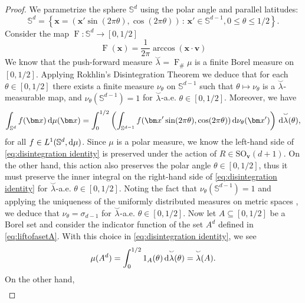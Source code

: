 \documentclass[reqno, a4paper]{amsart}
\def\F{\operatorname{F}}
\renewcommand{\d}{\text{\rm d}}
\newcommand{\Sd}{\mathbb{S}^d}
\newcommand{\x}{{\bm x}}
\renewcommand{\v}{{\bm v}}
\newcommand{\lambdarc}{\overset{\smallsmile}{\lambda}}
\theoremstyle{plain}
\theoremstyle{definition}
\theoremstyle{remarkstyle}
\numberwithin{equation}{section}
\begin{document}
\begin{proof}
   We parametrize the sphere $\Sd$ using the polar angle and parallel latitudes: 
\begin{equation*}
    \Sd=\left\{\x=(\x'\sin(2\pi \theta), \cos(2\pi \theta)) \,:\, \x'\in \mathbb{S}^{d-1}, 0\leq \theta\leq 1/2\right\}. 
\end{equation*}
Consider the map $\operatorname{F}:\Sd\to [0, 1/2]$
\begin{equation*}
    \F(\x)=\frac{1}{2\pi} \arccos(\x\cdot\v)
\end{equation*}
We know that the push-forward measure $\lambdarc=\operatorname{F}_{\#} \mu$ is a finite Borel measure on $[0, 1/2]$. Applying Rokhlin's Disintegration Theorem \cite[Theorem 5.3.1]{AmbrosioGigliSavare2008-GradientFlows}
we deduce that for each $\theta \in [0, 1/2]$ there exists a finite measure $\nu_\theta$ on $\mathbb{S}^{d-1}$ such that $\theta \mapsto \nu_\theta$ is a $\lambdarc$-measurable map, and $\nu_\theta(\mathbb{S}^{d-1})=1$ for $\lambdarc$-a.e. $\theta\in [0, 1/2]$. Moreover, we have
\begin{equation}\label{eq:disintegration identity}
    \int_{\Sd} f(\bm x)\, \d\mu(\bm x)= \int_{0}^{1/2} \left(\int_{\mathbb{S}^{d-1}} f(\x'\sin(2\pi \theta), \cos(2\pi \theta))\,\d\nu_\theta(\bm x')\right)\,\d\lambdarc(\theta),
\end{equation}
for all $f \in L^1(\Sd, \d\mu)$. Since $\mu$ is a polar measure, we know the left-hand side of \eqref{eq:disintegration identity} is preserved under the action of $R\in \mathrm{SO}_{\bm v}(d+1)$. On the other hand, this action also preserves the polar angle $\theta\in [0, 1/2]$, thus it must preserve the inner integral on the right-hand side of \eqref{eq:disintegration identity} for $\lambdarc$-a.e. $\theta\in[0, 1/2]$.
Noting the fact that $\nu_{\theta}(\mathbb{S}^{d-1})=1$ and applying the uniqueness of the uniformly distributed measures on metric spaces \cite[Theorem 3.4]{MattilaGeometryOfSets1995}, we deduce
that $\nu_\theta=\sigma_{d-1}$ for $\lambdarc$-a.e. $\theta\in [0, 1/2]$. Now let $A\subseteq [0, 1/2]$ be a Borel set and consider the indicator function of the set $A^d$ defined in \eqref{eq:liftofasetA}. With this choice in \eqref{eq:disintegration identity}, we see
\begin{equation*}
    \mu(A^d)=\int_{0}^{1/2} 1_{A}(\theta)\, \d\lambdarc(\theta)=\lambdarc(A).
\end{equation*}
On the other hand,
\begin{equation*}
\begin{split}

\end{split}
\end{equation*}
\end{proof}
\end{document}
